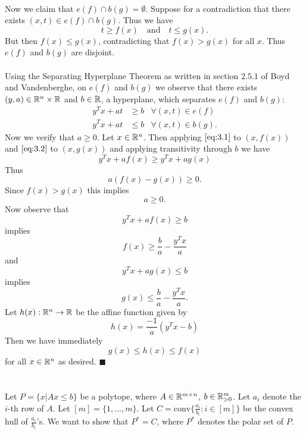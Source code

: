 \documentclass[letterpaper,12pt,oneside,onecolumn]{article}
\begin{document}
\paragraph{}
Now we claim that $e(f) \cap b(g) = \emptyset$. Suppose for a contradiction that there exists $(x,t) \in e(f) \cap b(g)$. Thus we have
$$t \geq f(x) \quad \text{and}\quad t \leq g(x).$$
But then $f(x) \leq g(x)$, contradicting that $f(x) > g(x)$ for all $x$. Thus $e(f)$ and $b(g)$ are disjoint.
\paragraph{}
Using the Separating Hyperplane Theorem as written in section $2.5.1$ of Boyd and Vandenberghe, on $e(f)$ and $b(g)$ we observe that there exists $(y,a) \in \mathbb{R}^n \times \mathbb{R}$ and $b \in \mathbb{R}$, a hyperplane, which separates $e(f)$ and $b(g)$:
\begin{align}
y^Tx + at &\geq b &\forall (x,t) \in e(f) \label{eq:3.1}\\
y^Tx + at &\leq b &\forall (x,t) \in b(g) \label{eq:3.2}.
\end{align}
Now we verify that $a\geq 0$. Let $x \in \mathbb{R}^n$. Then applying $\ref{eq:3.1}$ to $(x,f(x))$ and $\ref{eq:3.2}$ to $(x,g(x))$ and applying transitivity through $b$ we have
$$y^Tx + af(x) \geq y^Tx + ag(x)$$
Thus
$$a(f(x) - g(x)) \geq 0.$$
Since $f(x) > g(x)$ this implies
$$a \geq 0.$$
Now observe that
$$y^Tx + af(x) \geq b$$
implies
$$ f(x) \geq \frac{b}{a} - \frac{y^Tx}{a}$$
and
$$ y^Tx + ag(x) \leq b$$
implies 
$$g(x) \leq \frac{b}{a} - \frac{y^Tx}{a}.$$
Let $h(x): \mathbb{R}^n \rightarrow \mathbb{R}$ be the affine function given by
$$h(x) =\frac{-1}{a}(y^Tx - b)$$
Then we have immediately
$$g(x) \leq h(x) \leq f(x)$$
for all $x \in \mathbb{R}^n$ as desired. $\blacksquare$

\section{}
\paragraph{}
Let $P = \{ x| Ax \leq b\}$ be a polytope, where $A \in \mathbb{R}^{m\times n}$, $b \in \mathbb{R}^m_{>0}$. Let $a_i$ denote the $i$-th row of $A$. Let $[m] = \{1,\dots, m\}$. Let $C = \text{conv} \{\frac{a_i}{b_i} : i\in [m]\}$ be the convex hull of $\frac{a_i}{b_i}$'s. We want to show that $P^* = C$, where $P^*$ denotes the polar set of $P$.
\end{document}
